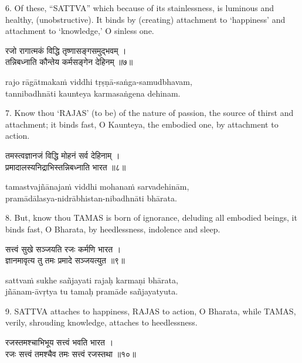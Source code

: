 6. Of these, ``SATTVA'' which because of its stainlessness, is luminous and
healthy, (unobstructive). It binds by (creating) attachment to `happiness' and
attachment to `knowledge,' O sinless one.

\begin{gitaverse}
रजो रागात्मकं विद्धि तृष्णासङ्गसमुद्भवम् । \\
तन्निबध्नाति कौन्तेय कर्मसङ्गेन देहिनम् ॥७॥
\end{gitaverse}

\begin{transliteration}
rajo rāgātmakaṁ viddhi tṛṣṇā-saṅga-samudbhavam, \\
tannibadhnāti kaunteya karmasaṅgena dehinam.
\end{transliteration}

7. Know thou `RAJAS' (to be) of the nature of passion, the source of thirst and
attachment; it binds fast, O Kaunteya, the embodied one, by attachment to
action.

\begin{gitaverse}
तमस्त्वज्ञानजं विद्धि मोहनं सर्व देहिनाम् । \\
प्रमादालस्यनिद्राभिस्तन्निबध्नाति भारत ॥८॥
\end{gitaverse}

\begin{transliteration}
tamastvajñānajaṁ viddhi mohanaṁ sarvadehinām, \\
pramādālasya-nidrābhistan-nibadhnāti bhārata.
\end{transliteration}

8. But, know thou TAMAS is born of ignorance, deluding all embodied beings, it
binds fast, O Bharata, by heedlessness, indolence and sleep.

\begin{gitaverse}
सत्त्वं सुखे सञ्जयति रजः कर्मणि भारत । \\
ज्ञानमावृत्य तु तमः प्रमादे सञ्जयत्युत ॥९॥
\end{gitaverse}

\begin{transliteration}
sattvaṁ sukhe sañjayati rajaḥ karmaṇi bhārata, \\
jñānam-āvṛtya tu tamaḥ pramāde sañjayatyuta.
\end{transliteration}

9. SATTVA attaches to happiness, RAJAS to action, O Bharata, while TAMAS,
verily, shrouding knowledge, attaches to heedlessness.

\begin{gitaverse}
रजस्तमश्चाभिभूय सत्त्वं भवति भारत । \\
रजः सत्त्वं तमश्चैव तमः सत्त्वं रजस्तथा ॥१०॥
\end{gitaverse}

